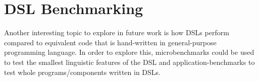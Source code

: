 \section{DSL Benchmarking}
Another interesting topic to explore in future work is how \acp{DSL} perform compared to equivalent code that is hand-written in general-purpose programming language. In order to explore this, microbenchmarks could be used to test the smallest linguistic features of the \ac{DSL} and application-benchmarks to test whole programs/components written in \acp{DSL}.